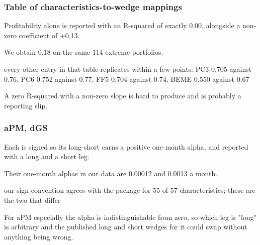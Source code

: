 \documentclass[11pt]{article}
\begin{document}
\subsubsection*{Table of characteristics-to-wedge mappings}
\begin{description}[leftmargin=2.4cm,labelwidth=2.2cm,font=\normalfont\bfseries,style=sameline]
\item[Documented:] Profitability alone is reported with an R-squared of exactly 0.00, alongside a non-zero coefficient of +0.13.
\item[Implemented:] We obtain 0.18 on the same 114 extreme portfolios.
\item[Evidence:] every other entry in that table replicates within a few points: PC3 0.705 against 0.76, PC6 0.752 against 0.77, FF5 0.704 against 0.74, BEME 0.550 against 0.67
\item[Why it matters:] A zero R-squared with a non-zero slope is hard to produce and is probably a reporting slip.
\end{description}
\subsubsection*{aPM, dGS}
\begin{description}[leftmargin=2.4cm,labelwidth=2.2cm,font=\normalfont\bfseries,style=sameline]
\item[Documented:] Each is signed so its long-short earns a positive one-month alpha, and reported with a long and a short leg.
\item[Implemented:] Their one-month alphas in our data are 0.00012 and 0.0013 a month.
\item[Evidence:] our sign convention agrees with the package for 55 of 57 characteristics; these are the two that differ
\item[Why it matters:] For aPM especially the alpha is indistinguishable from zero, so which leg is "long" is arbitrary and the published long and short wedges for it could swap without anything being wrong.
\end{description}
\end{document}
